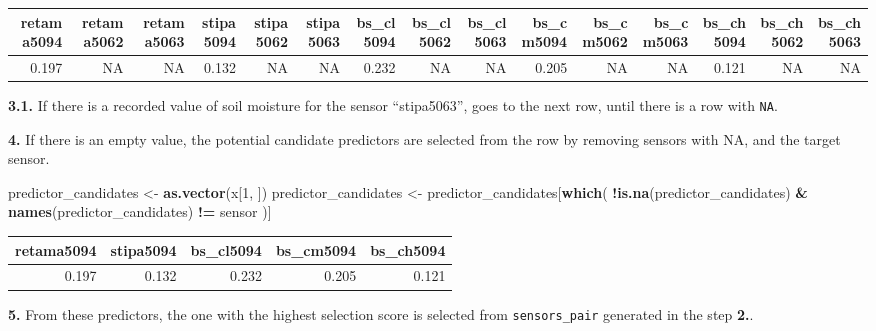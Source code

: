 \documentclass[]{article}
\newenvironment{Shaded}{\begin{snugshade}}{\end{snugshade}}
\newcommand{\DecValTok}[1]{\textcolor[rgb]{0.00,0.00,0.81}{#1}}
\newcommand{\KeywordTok}[1]{\textcolor[rgb]{0.13,0.29,0.53}{\textbf{#1}}}
\newcommand{\NormalTok}[1]{#1}
\newcommand{\OperatorTok}[1]{\textcolor[rgb]{0.81,0.36,0.00}{\textbf{#1}}}
\newcommand{\StringTok}[1]{\textcolor[rgb]{0.31,0.60,0.02}{#1}}
\begin{document}
\begin{tabular}[t]{r|r|r|r|r|r|r|r|r|r|r|r|r|r|r}
\hline
retama5094 & retama5062 & retama5063 & stipa5094 & stipa5062 & stipa5063 & bs\_cl5094 & bs\_cl5062 & bs\_cl5063 & bs\_cm5094 & bs\_cm5062 & bs\_cm5063 & bs\_ch5094 & bs\_ch5062 & bs\_ch5063\\
\hline
0.197 & NA & NA & 0.132 & NA & NA & 0.232 & NA & NA & 0.205 & NA & NA & 0.121 & NA & NA\\
\hline
\end{tabular}

\textbf{3.1.} If there is a recorded value of soil moisture for the
sensor ``stipa5063'', goes to the next row, until there is a row with
\texttt{NA}.

\textbf{4.} If there is an empty value, the potential candidate
predictors are selected from the row by removing sensors with NA, and
the target sensor.

\begin{Shaded}
\begin{Highlighting}[]
\NormalTok{predictor_candidates <-}\StringTok{ }\KeywordTok{as.vector}\NormalTok{(x[}\DecValTok{1}\NormalTok{, ])}
\NormalTok{predictor_candidates <-}\StringTok{ }\NormalTok{predictor_candidates[}\KeywordTok{which}\NormalTok{(}
      \OperatorTok{!}\KeywordTok{is.na}\NormalTok{(predictor_candidates) }\OperatorTok{&}\StringTok{ }
\StringTok{        }\KeywordTok{names}\NormalTok{(predictor_candidates) }\OperatorTok{!=}\StringTok{ }\NormalTok{sensor}
\NormalTok{      )]}
\end{Highlighting}
\end{Shaded}

\begin{tabular}[t]{r|r|r|r|r}
\hline
retama5094 & stipa5094 & bs\_cl5094 & bs\_cm5094 & bs\_ch5094\\
\hline
0.197 & 0.132 & 0.232 & 0.205 & 0.121\\
\hline
\end{tabular}

\textbf{5.} From these predictors, the one with the highest selection
score is selected from \texttt{sensors\_pair} generated in the step
\textbf{2.}.

\begin{Shaded}
\end{Shaded}
\end{document}
